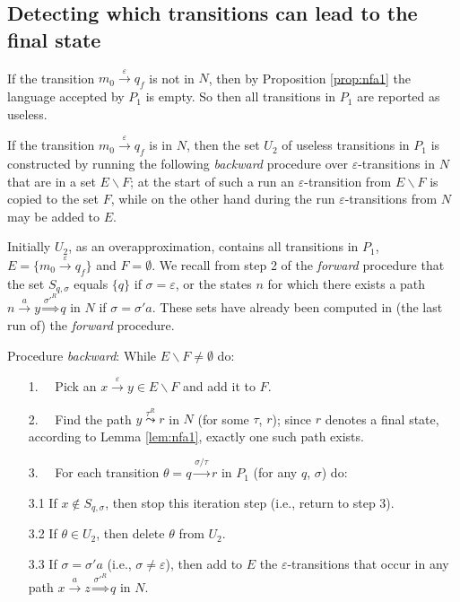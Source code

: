 \documentclass{llncs}
\newcommand{\eps}{\ensuremath{\varepsilon}}
\begin{document}
\subsection{Detecting which transitions can lead to the final state}
\label{sec:backward}

If the transition $m_0\stackrel{\eps}{\rightarrow}q_f$ is not in $N$, then by Proposition \ref{prop:nfa1} the language accepted by $P_1$
is empty. So then all transitions in $P_1$ are reported as useless.

If the transition $m_0\stackrel{\eps}{\rightarrow}q_f$ is in $N$, then
the set $U_2$ of useless transitions in $P_1$ is constructed by running the following {\em backward} procedure
over $\eps$-transitions in $N$ that are in a set $E\backslash F$; at the start of such a run an $\eps$-transition from $E\backslash F$ is
copied to the set $F$, while on the other hand during the run $\eps$-transitions from $N$ may be added to $E$.

Initially $U_2$, as an overapproximation, contains all transitions in $P_1$, $E=\{m_0\stackrel{\eps}{\rightarrow}q_f\}$
and $F=\emptyset$. We recall from step 2 of the {\em forward} procedure that the set $S_{q,\sigma}$ equals $\{q\}$ if $\sigma=\eps$,
or the states $n$ for which there exists a path $n\stackrel{a}{\rightarrow}y\stackrel{\sigma'^R}{\Longrightarrow}q$ in $N$ if $\sigma=\sigma'a$.
These sets have already been computed in (the last run of) the {\em forward} procedure.

\vspace{4mm}

\noindent
Procedure {\em backward}: While $E\backslash F\neq\emptyset$ do:
\begin{enumerate}
\item[1.~~]
Pick an $x\stackrel{\eps}{\rightarrow}y\in E\backslash F$ and add it to $F$.\vspace{1mm}
\item[2.~~]
Find the path $y\stackrel{\tau^R}{\leadsto}r$ in $N$ (for some $\tau$, $r$); since $r$ denotes a final state, according to Lemma \ref{lem:nfa1}, exactly one such path exists.\vspace{1mm}
\item[3.~~]
For each transition $\theta=q\stackrel{\sigma/\tau}{\rightarrow}r$ in $P_1$ (for any $q$, $\sigma$) do:\vspace{1mm}
\item[3.1]
If $x\not\in S_{q,\sigma}$, then stop this iteration step (i.e., return to step 3).\vspace{1mm}
\item[3.2]
If $\theta\in U_2$, then delete $\theta$ from $U_2$.\vspace{1mm}
\item[3.3]
If $\sigma=\sigma' a$ (i.e., $\sigma\neq\eps$), then add to $E$ the $\eps$-transitions that occur in any path
$x\stackrel{a}{\rightarrow}z\stackrel{\sigma'^R}{\Rightarrow}q$ in $N$.
\end{enumerate}
\end{document}
